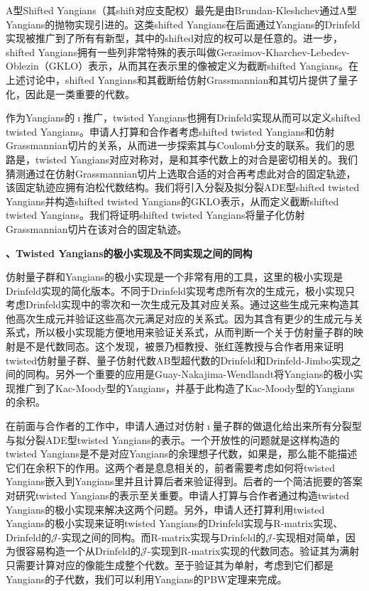 \documentclass[12pt,UTF8,AutoFakeBold=4,a4paper]{ctexart}
\begin{document}
A型Shifted Yangians（其shift对应支配权）最先是由Brundan-Kleshchev通过A型Yangians的抛物实现引进的。这类shifted Yangians在后面通过Yangians的Drinfeld实现被推广到了所有有新型，其中的shifted对应的权可以是任意的。进一步，shifted Yangians拥有一些列非常特殊的表示叫做Gerasimov-Kharchev-Lebedev-Oblezin（GKLO）表示，从而其在表示里的像被定义为截断shifted Yangians。在上述讨论中，shifted Yangians和其截断给仿射Grassmannian和其切片提供了量子化，因此是一类重要的代数。

作为Yangians的$\imath$推广，twisted Yangians也拥有Drinfeld实现从而可以定义shifted twisted Yangians。申请人打算和合作者考虑shifted twisted Yangians和仿射Grassmannian切片的关系，从而进一步探索其与Coulomb分支的联系。我们的思路是，twisted Yangians对应对称对，是和其李代数上的对合是密切相关的。我们猜测通过在仿射Grassmannian切片上选取合适的对合再考虑此对合的固定轨迹，该固定轨迹应拥有泊松代数结构。我们将引入分裂及拟分裂ADE型shifted twisted Yangians并构造shifted twisted Yangians的GKLO表示，从而定义截断shifted twisted Yangians。我们将证明shifted twisted Yangians将量子化仿射Grassmannian切片在该对合的固定轨迹。

\medskip

\textbf{、Twisted Yangians的极小实现及不同实现之间的同构}

仿射量子群和Yangians的极小实现是一个非常有用的工具，这里的极小实现是Drinfeld实现的简化版本。不同于Drinfeld实现考虑所有次的生成元，极小实现只考虑Drinfeld实现中的零次和一次生成元及其对应关系。通过这些生成元来构造其他高次生成元并验证这些高次元满足对应的关系式。因为其含有更少的生成元与关系式，所以极小实现能方便地用来验证关系式，从而判断一个关于仿射量子群的映射是不是代数同态。这个发现，被景乃桓教授、张红莲教授与合作者用来证明twisted仿射量子群、量子仿射代数AB型超代数的Drinfeld和Drinfeld-Jimbo实现之间的同构。另外一个重要的应用是Guay-Nakajima-Wendlandt将Yangians的极小实现推广到了Kac-Moody型的Yangians，并基于此构造了Kac-Moody型的Yangians的余积。

在前面与合作者的工作中，申请人通过对仿射$\imath$量子群的做退化给出来所有分裂型与拟分裂ADE型twisted Yangians的表示。一个开放性的问题就是这样构造的twisted Yangians是不是对应Yangians的余理想子代数，如果是，那么能不能描述它们在余积下的作用。这两个者是息息相关的，前者需要考虑如何将twisted Yangians嵌入到Yangians里并且计算后者来验证得到。后者的一个简洁扼要的答案对研究twisted Yangians的表示至关重要。申请人打算与合作者通过构造twisted Yangians的极小实现来解决这两个问题。另外，申请人还打算利用twisted Yangians的极小实现来证明twisted Yangians的Drinfeld实现与R-matrix实现、Drinfeld的$\mathcal J$-实现之间的同构。而R-matrix实现与Drinfeld的$\mathcal J$-实现相对简单，因为很容易构造一个从Drinfeld的$\mathcal J$-实现到R-matrix实现的代数同态。验证其为满射只需要计算对应的像能生成整个代数。至于验证其为单射，考虑到它们都是Yangians的子代数，我们可以利用Yangians的PBW定理来完成。
\end{document}
